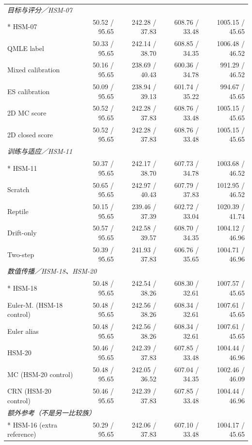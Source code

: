 \begin{longtable}{@{}p{.25\linewidth}rrrr@{}}
\multicolumn{5}{l}{\textit{目标与评分／HSM-07}}\\*
HSM-07 & 50.52 / 95.65 & 242.28 / 37.83 & 608.76 / 33.48 & 1005.15 / 45.65\\
QMLE label & 50.33 / 95.65 & 242.14 / 38.70 & 608.85 / 34.35 & 1006.48 / 46.52\\
Mixed calibration & 50.16 / 95.65 & 238.69 / 40.43 & 600.36 / 34.78 & 991.29 / 46.52\\
ES calibration & 50.09 / 95.65 & 238.94 / 39.13 & 601.74 / 35.22 & 994.67 / 45.65\\
2D MC score & 50.52 / 95.65 & 242.28 / 37.83 & 608.76 / 33.48 & 1005.15 / 45.65\\
2D closed score & 50.52 / 95.65 & 242.28 / 37.83 & 608.76 / 33.48 & 1005.15 / 45.65\\
\multicolumn{5}{l}{\textit{训练与适应／HSM-11}}\\*
HSM-11 & 50.37 / 95.65 & 242.17 / 38.70 & 607.73 / 34.78 & 1003.68 / 46.52\\
Scratch & 50.65 / 95.65 & 242.97 / 40.43 & 607.79 / 37.83 & 1012.95 / 46.52\\
Reptile & 50.15 / 95.65 & 239.46 / 37.39 & 602.72 / 33.04 & 1020.39 / 41.74\\
Drift-only & 50.57 / 95.65 & 242.58 / 39.57 & 608.70 / 34.35 & 1004.12 / 46.96\\
Two-step & 50.39 / 95.65 & 241.93 / 37.83 & 606.76 / 35.65 & 1004.71 / 46.96\\
\multicolumn{5}{l}{\textit{数值传播／HSM-18、HSM-20}}\\*
HSM-18 & 50.48 / 95.65 & 242.54 / 38.26 & 608.30 / 32.61 & 1007.57 / 45.65\\
Euler-M. (HSM-18 control) & 50.48 / 95.65 & 242.56 / 38.26 & 608.34 / 32.61 & 1007.61 / 45.65\\
Euler alias & 50.48 / 95.65 & 242.56 / 38.26 & 608.34 / 32.61 & 1007.61 / 45.65\\
HSM-20 & 50.46 / 95.65 & 242.39 / 37.83 & 607.85 / 33.48 & 1004.44 / 46.96\\
MC (HSM-20 control) & 50.48 / 95.65 & 242.05 / 36.52 & 607.04 / 34.35 & 1002.46 / 46.09\\
CRN (HSM-20 control) & 50.46 / 95.65 & 242.39 / 37.83 & 607.85 / 33.48 & 1004.44 / 46.96\\
\multicolumn{5}{l}{\textit{额外参考（不是另一比较族）}}\\*
HSM-16 (extra reference) & 50.29 / 95.65 & 242.06 / 37.83 & 607.10 / 33.48 & 1004.17 / 45.65\\
\end{longtable}
\endgroup
